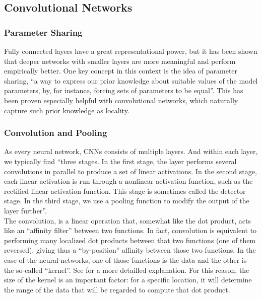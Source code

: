 \subsection{Convolutional Networks}

\subsubsection{Parameter Sharing}

Fully connected layers have a great representational power, but it has been shown that deeper networks with smaller layers are more meaningful and perform empirically better\cite[p.202]{goodfellow}. One key concept in this context is the idea of parameter sharing, ``a way to express our prior knowledge about suitable values of the model parameters, by, for instance, forcing sets of parameters to be equal''\cite[p.251]{goodfellow}. This has been proven especially helpful with convolutional networks, which naturally capture such prior knowledge as locality.\\

\subsubsection{Convolution and Pooling}

As every neural network, CNNs consists of multiple layers. And within each layer, we typically find ``three stages. In the first stage, the layer performs several convolutions in parallel to produce a set of linear activations. In the second stage, each linear activation is run through a nonlinear activation function, such as the rectified linear activation function. This stage is sometimes called the detector stage. In the third stage, we use a pooling function to modify the output of the layer further''\cite[p.340]{goodfellow}.\\

The convolution, is a linear operation that, somewhat like the dot product, acts like an ``affinity filter'' between two functions. In fact, convolution is equivalent to performing many localized dot products between that two functions (one of them reversed), giving thus a ``by-position'' affinity between those two functions. In the case of the neural networks, one of those functions is the data and the other is the so-called ``kernel''. See \cite[p.332]{goodfellow} for a more detailled explanation. For this reason, the size of the kernel is an important factor: for a specific location, it will determine the range of the data that will be regarded to compute that dot product. \\

